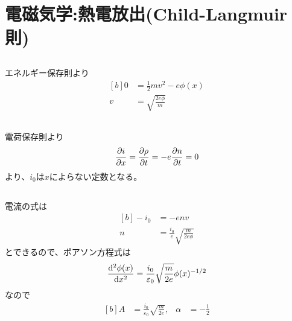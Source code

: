 \documentclass[../ap_2013.tex]{subfiles}
\begin{document}
\setcounter{chapter}{1}
\chapter{電磁気学:熱電放出(Child-Langmuir 則)}
\section{}
エネルギー保存則より
\begin{equation}\begin{aligned}[b]
    0 &= \frac{1}{2}mv^2 -e\phi(x)\\
    v&= \sqrt{\frac{2e\phi}{m}}
\end{aligned}\end{equation}
\section{}
電荷保存則より
\begin{equation}\begin{aligned}[b]
    \pdv{i}{x}=\pdv{\rho}{t} = -e\pdv{n}{t} = 0
\end{aligned}\end{equation}
より、\(i_0\)は\(x\)によらない定数となる。

\section{}
電流の式は
\begin{equation}\begin{aligned}[b]
    -i_0 &= -env\\
    n &= \frac{i_0}{e}\sqrt{\frac{m}{2e\phi}}
\end{aligned}\end{equation}
とできるので、ポアソン方程式は
\begin{equation}\begin{aligned}[b]
    \dv[2]{\phi(x)}{x}=\frac{i_0}{\varepsilon_0}\sqrt{\frac{m}{2e}}\phi(x)^{-1/2}
\end{aligned}\end{equation}
なので
\begin{equation}\begin{aligned}[b]
    A &= \frac{i_0}{\varepsilon_0}\sqrt{\frac{m}{2e}}, & \alpha &= -\frac{1}{2}
\end{aligned}\end{equation}

\section{}
\end{document}

